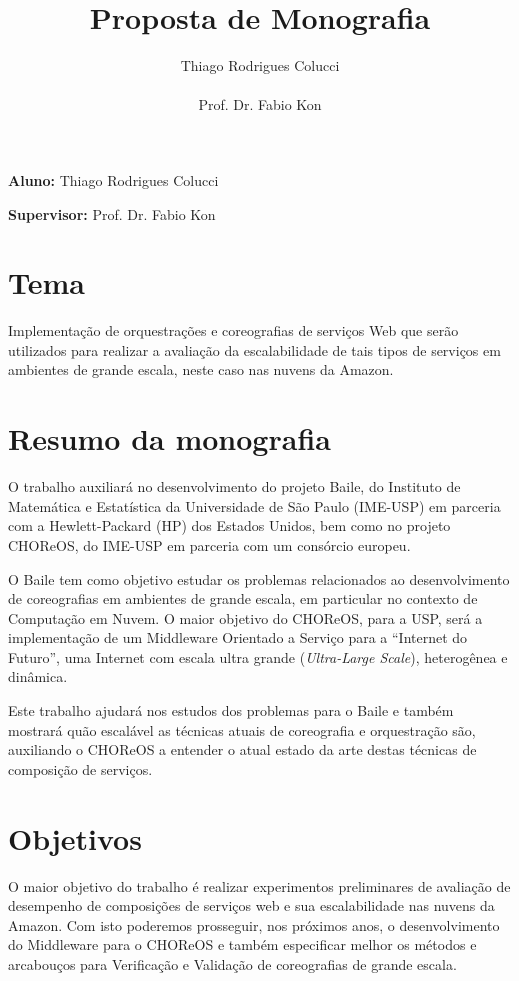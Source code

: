 \documentclass[11pt,a4paper]{article}
\title{Proposta de Monografia}
\author{Thiago Rodrigues Colucci\\\\Prof. Dr. Fabio Kon}
\begin{document}
\maketitle

\newpage

\tableofcontents
\newpage
\textbf{Aluno:} Thiago Rodrigues Colucci

\textbf{Supervisor:} Prof. Dr. Fabio Kon

\section{Tema}
Implementação de orquestrações e coreografias de serviços Web que serão utilizados para realizar a avaliação da escalabilidade de tais tipos de serviços em ambientes de grande escala, neste caso nas nuvens da Amazon.

\section{Resumo da monografia}
O trabalho auxiliará no desenvolvimento do projeto Baile, do Instituto de Matemática e Estatística da Universidade de São Paulo (IME-USP) em parceria com a Hewlett-Packard (HP) dos Estados Unidos, bem como no projeto CHOReOS, do IME-USP em parceria com um consórcio europeu. 

O Baile tem como objetivo estudar os problemas relacionados ao desenvolvimento de coreografias em ambientes de grande escala, em particular no contexto de Computação em Nuvem. O maior objetivo do CHOReOS, para a USP, será a implementação de um Middleware Orientado a Serviço para a ``Internet do Futuro'', uma Internet com escala ultra grande (\textit{Ultra-Large Scale}), heterogênea e dinâmica. 

Este trabalho ajudará nos estudos dos problemas para o Baile e também mostrará quão escalável as técnicas atuais de coreografia e orquestração são, auxiliando o CHOReOS a entender o atual estado da arte destas técnicas de composição de serviços.

\section{Objetivos}
O maior objetivo do trabalho é realizar experimentos preliminares de avaliação de desempenho de composições de serviços web e sua escalabilidade nas nuvens da Amazon. Com isto poderemos prosseguir, nos próximos anos, o desenvolvimento do Middleware para o CHOReOS e também especificar melhor os métodos e arcabouços para Verificação e Validação de coreografias de grande escala.
\end{document}
